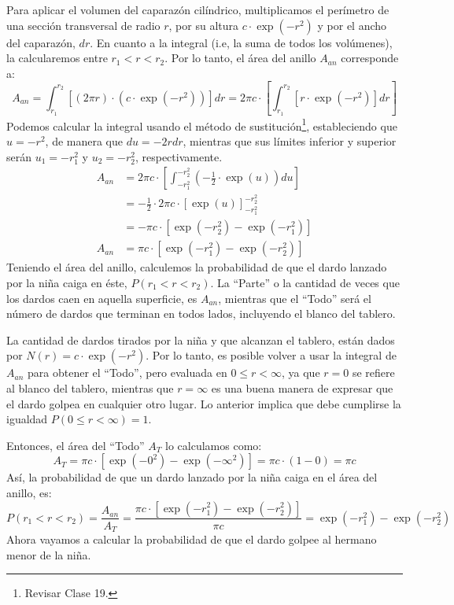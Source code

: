 \documentclass[12pt]{article}
\begin{document}
Para aplicar el volumen del caparazón cilíndrico, multiplicamos el perímetro de una sección transversal de radio $r$, por su altura $c \cdot \exp(-r^{2})$ y por el ancho del caparazón, $dr$. En cuanto a la integral (i.e, la suma de todos los volúmenes), la calcularemos entre $r_{1} < r < r_{2}$. Por lo tanto, el área del anillo $A_{an}$ corresponde a:
\[
  A_{an} = \int_{r_{1}}^{r_{2}} [(2 \pi r) \cdot (c \cdot \exp(-r^{2}))] dr
         = 2 \pi c \cdot \left[\int_{r_{1}}^{r_{2}}[r \cdot \exp(-r^{2})] dr \right]
\]
Podemos calcular la integral usando el método de sustitución\footnote{Revisar Clase 19.}, estableciendo que $u = -r^{2}$, de manera que $du = -2rdr$, mientras que sus límites inferior y superior serán $u_{1} = -r_{1}^{2}$ y $u_{2} = -r_{2}^{2}$, respectivamente.
\begin{align*}
  A_{an} &= 2 \pi c \cdot \left[\int_{-r_{1}^{2}}^{-r_{2}^{2}}\left(-\frac{1}{2} \cdot \exp(u)\right) du \right] \\
         &= -\frac{1}{2} \cdot 2 \pi c \cdot [\exp(u)]_{-r_{1}^{2}}^{-r_{2}^{2}} \\
         &= -\pi c \cdot [\exp(-r_{2}^{2}) - \exp(-r_{1}^{2})] \\
  A_{an} &= \pi c \cdot [\exp(-r_{1}^{2}) - \exp(-r_{2}^{2})]
\end{align*}
Teniendo el área del anillo, calculemos la probabilidad de que el dardo lanzado por la niña caiga en éste, $P(r_{1} < r < r_{2})$. La ``Parte'' o la cantidad de veces que los dardos caen en aquella superficie, es $A_{an}$, mientras que el ``Todo'' será el número de dardos que terminan en todos lados, incluyendo el blanco del tablero.

La cantidad de dardos tirados por la niña y que alcanzan el tablero, están dados por $N(r) = c \cdot \exp(-r^{2})$. Por lo tanto, es posible volver a usar la integral de $A_{an}$ para obtener el ``Todo'', pero evaluada en $0 \leq r < \infty$, ya que $r = 0$ se refiere al blanco del tablero, mientras que $r = \infty$ es una buena manera de expresar que el dardo golpea en cualquier otro lugar. Lo anterior implica que debe cumplirse la igualdad $P(0 \leq r < \infty) = 1$.

Entonces, el área del ``Todo'' $A_{T}$ lo calculamos como:
\[
  A_{T} = \pi c \cdot [\exp(-0^{2}) - \exp(-\infty^{2})] = \pi c \cdot (1 - 0) = \pi c
\]
Así, la probabilidad de que un dardo lanzado por la niña caiga en el área del anillo, es:
\[
  P(r_{1} < r < r_{2}) = \frac{A_{an}}{A_{T}}
                       = \frac{\pi c \cdot [\exp(-r_{1}^{2}) - \exp(-r_{2}^{2})]}{\pi c}
                       = \exp(-r_{1}^{2}) - \exp(-r_{2}^{2})
\]
Ahora vayamos a calcular la probabilidad de que el dardo golpee al hermano menor de la niña.
\end{document}
